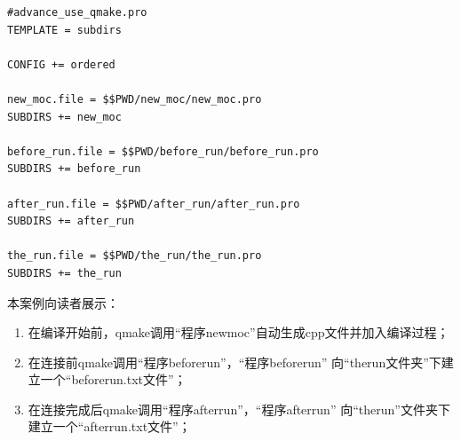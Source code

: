 \begin{lstlisting}[label=f000004,
caption=GoodLuck,
title=\lstlistingname\ \thelstlisting
]
#advance_use_qmake.pro
TEMPLATE = subdirs

CONFIG += ordered

new_moc.file = $$PWD/new_moc/new_moc.pro
SUBDIRS += new_moc

before_run.file = $$PWD/before_run/before_run.pro
SUBDIRS += before_run

after_run.file = $$PWD/after_run/after_run.pro
SUBDIRS += after_run

the_run.file = $$PWD/the_run/the_run.pro
SUBDIRS += the_run
\end{lstlisting}          %

本案例向读者展示：
\begin{enumerate}
\item 在编译开始前，qmake调用“程序new\underline{\hspace{0.5em}}moc”自动生成cpp文件并加入编译过程；
\item 在连接前qmake调用“程序before\underline{\hspace{0.5em}}run”，“程序before\underline{\hspace{0.5em}}run”
向“the\underline{\hspace{0.5em}}run文件夹”下建立一个“before\underline{\hspace{0.5em}}run.txt文件”；
\item 在连接完成后qmake调用“程序after\underline{\hspace{0.5em}}run”，“程序after\underline{\hspace{0.5em}}run”
向“the\underline{\hspace{0.5em}}run”文件夹下建立一个“after\underline{\hspace{0.5em}}run.txt文件”；
\end{enumerate}



